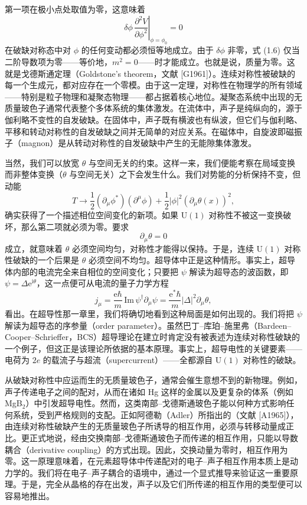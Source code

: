 第一项在极小点处取值为零，这意味着
\begin{equation*}
\delta\phi\,\left.\frac{\partial^2 V}{\partial\phi^2}\right|_{\phi=\phi_0}=0
\tag{1.6}
\end{equation*}
在破缺对称态中对 $\phi$ 的任何变动都必须恒等地成立。由于 $\delta\phi$ 非零，式 (1.6) 仅当二阶导数项为零——等价地，$m^2=0$——时才能成立。也就是说，质量为零。这就是戈德斯通定理（Goldstone's theorem，文献 [G1961]）。连续对称性被破缺的每一个生成元，都对应存在一个零模。由于这一定理，对称性在物理学的所有领域——特别是粒子物理和凝聚态物理——都占据着核心地位。凝聚态系统中出现的无质量玻色子通常代表整个多体系统的集体激发。在流体中，声子是纯纵向的，源于伽利略不变性的自发破缺。在固体中，声子既有横波也有纵波，但它们与伽利略、平移和转动对称性的自发破缺之间并无简单的对应关系。在磁体中，自旋波即磁振子（magnon）是从转动对称性的自发破缺中产生的无能隙集体激发。

当然，我们可以放宽 $\theta$ 与空间无关的约束。这样一来，我们便能考察在局域变换而非整体变换（$\theta$ 与空间无关）之下会发生什么。我们对势能的分析保持不变，但动能
\begin{equation*}
T\to\frac{1}{2}(\partial_\mu\phi^*)(\partial^\mu\phi)+\frac{1}{2}|\phi|^2(\partial_\mu\theta(x))^2,
\tag{1.7}
\end{equation*}
确实获得了一个描述相位空间变化的新项。如果 $\mathrm{U}(1)$ 对称性不被这一变换破坏，那么第二项就必须为零。要求
\begin{equation*}
\partial_\mu\theta=0
\tag{1.8}
\end{equation*}
成立，就意味着 $\theta$ 必须空间均匀，对称性才能得以保持。于是，连续 $\mathrm{U}(1)$ 对称性破缺的一个后果是 $\theta$ 必须空间不均匀。超导体中正是这种情形。事实上，超导体内部的电流完全来自相位的空间变化；只要把 $\psi$ 解读为超导态的波函数，即 $\psi=\Delta\mathrm{e}^{\mathrm{i}\theta}$，这一点便可从电流的量子力学方程
\begin{equation*}
j_\mu=\frac{\mathrm{e}\hbar}{m}\,\mathrm{Im}\,\psi^\dagger\partial_\mu\psi=\frac{\mathrm{e}^*\hbar}{m}|\Delta|^2\partial_\mu\theta,
\tag{1.9}
\end{equation*}
看出。在超导性那一章里，我们将确切地看到这种局面是如何出现的。我们将把 $\psi$ 解读为超导态的序参量（order parameter）。虽然巴丁–库珀–施里弗（Bardeen–Cooper–Schrieffer，BCS）超导理论在建立时肯定没有被表述为连续对称性破缺的一个例子，但这正是该理论所依据的基本原理。事实上，超导电性的关键要素——电荷为 $2e$ 的载流子与超流（supercurrent）——全都源自 $\mathrm{U}(1)$ 对称性的破缺。

从破缺对称性中应运而生的无质量玻色子，通常会催生意想不到的新物理。例如，声子传递电子之间的配对，从而在诸如 Hg 这样的金属以及更复杂的体系（例如 MgB$_2$）中引发超导电性。然而，这类南部–戈德斯通玻色子能以何种方式影响任何系统，受到严格规则的支配。正如阿德勒（Adler）所指出的（文献 [A1965]），由连续对称性破缺产生的无质量玻色子所诱导的相互作用，必须与转移动量成正比。更正式地说，经由交换南部–戈德斯通玻色子而传递的相互作用，只能以导数耦合（derivative coupling）的方式出现。因此，交换动量为零时，相互作用为零。这一原理意味着，在元素超导体中传递配对的电子–声子相互作用本质上是动力学的。我们将在电子–声子耦合的语境中，通过一个显式推导来验证这一重要原理。于是，完全从晶格的存在出发，声子以及它们所传递的相互作用的类型便可以容易地推出。

